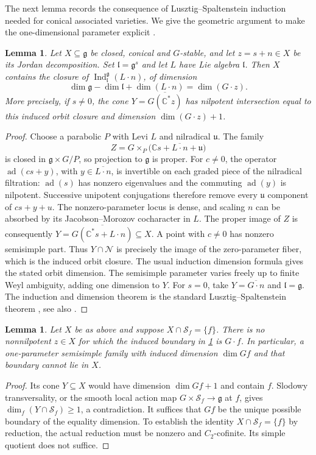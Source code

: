 \documentclass[11pt,a4paper]{amsart}
\numberwithin{equation}{section}
\newtheorem{lemma}[theorem]{Lemma}
\theoremstyle{definition}
\theoremstyle{remark}
\newcommand{\C}{\mathbb C}
\newcommand{\g}{\mathfrak g}
\newcommand{\uu}{\mathfrak u}
\newcommand{\lev}{\mathfrak l}
\newcommand{\N}{\mathcal N}
\newcommand{\ad}{\operatorname{ad}}
\begin{document}
The next lemma records the consequence of Lusztig--Spaltenstein
induction needed for conical associated varieties. We give the
geometric argument to make the one-dimensional parameter explicit
\cite{LusztigSpaltenstein}.
\begin{lemma}\label{vtwo:conic-boundary}
Let $X\subseteq\g$ be closed, conical and $G$-stable, and let
$z=s+n\in X$ be its Jordan decomposition. Set $\lev=\g^s$ and let
$L$ have Lie algebra $\lev$. Then $X$ contains the closure of
$\operatorname{Ind}_{\lev}^{\g}(L\cdot n)$, of dimension
$$
 \dim\g-\dim\lev+\dim(L\cdot n)=\dim(G\cdot z).
$$
More precisely, if $s\ne0$, the cone
$Y=\overline{G(\C^*z)}$ has nilpotent intersection equal to this
induced orbit closure and dimension $\dim(G\cdot z)+1$.
\end{lemma}
\begin{proof}
Choose a parabolic $P$ with Levi $L$ and nilradical $\uu$. The family
$$
 Z=G\times_P\bigl(\C s+\overline{L\cdot n}+\uu\bigr)
$$
is closed in $\g\times G/P$, so projection to $\g$ is proper. For
$c\ne0$, the operator $\ad(cs+y)$, with $y\in\overline{L\cdot n}$,
is invertible on each graded piece of the nilradical filtration:
$\ad(s)$ has nonzero eigenvalues and the commuting $\ad(y)$ is
nilpotent. Successive unipotent conjugations therefore remove every
$\uu$ component of $cs+y+u$. The nonzero-parameter locus is dense,
and scaling $n$ can be absorbed by its Jacobson--Morozov cocharacter
in $L$. The proper image of $Z$ is consequently
$Y=\overline{G(\C^*s+L\cdot n)}\subseteq X$.
A point with $c\ne0$ has nonzero semisimple part. Thus $Y\cap\N$
is precisely the image of the zero-parameter fiber, which is the
induced orbit closure. The usual induction dimension formula gives
the stated orbit dimension. The semisimple parameter varies freely
up to finite Weyl ambiguity, adding one dimension to $Y$.
For $s=0$, take $Y=\overline{G\cdot n}$ and $\lev=\g$.
The induction and dimension theorem is the standard
Lusztig--Spaltenstein theorem \cite{LusztigSpaltenstein}, see also
\cite[Appendix B.0.5, Theorem B.1]{AMLectures}.
\end{proof}

\begin{lemma}\label{vtwo:point-slice}
Let $X$ be as above and suppose $X\cap\mathcal S_f=\{f\}$.
There is no nonnilpotent $z\in X$ for which the induced boundary
in \cref{vtwo:conic-boundary} is $G\cdot f$. In particular, a
one-parameter semisimple family with induced dimension $\dim Gf$
and that boundary cannot lie in $X$.
\end{lemma}
\begin{proof}
Its cone $Y\subseteq X$ would have dimension $\dim Gf+1$ and contain
$f$. Slodowy transversality, or the smooth local action map
$G\times\mathcal S_f\to\g$ at $f$, gives
$\dim_f(Y\cap\mathcal S_f)\ge1$, a contradiction. It suffices that $Gf$ be the unique possible boundary of the equality
dimension. To establish the identity $X\cap\mathcal S_f=\{f\}$ by reduction,
the actual reduction must be nonzero and $C_2$-cofinite. Its simple quotient does not suffice.
\end{proof}
\end{document}
